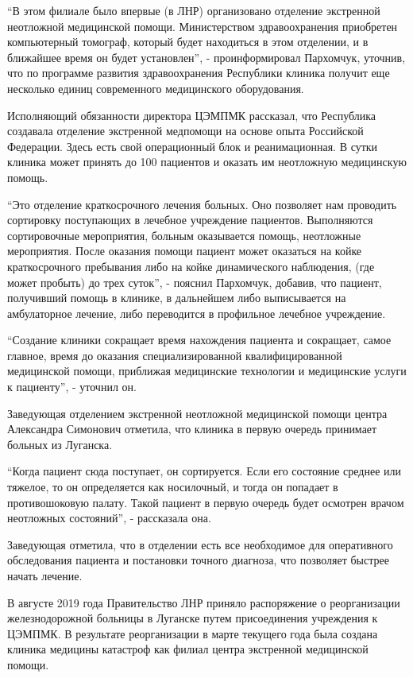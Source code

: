 \enquote{В этом филиале было впервые (в ЛНР) организовано отделение экстренной
неотложной медицинской помощи. Министерством здравоохранения приобретен
компьютерный томограф, который будет находиться в этом отделении, и в ближайшее
время он будет установлен}, - проинформировал Пархомчук, уточнив, что по
программе развития здравоохранения Республики клиника получит еще несколько
единиц современного медицинского оборудования.

Исполняющий обязанности директора ЦЭМПМК рассказал, что Республика создавала
отделение экстренной медпомощи на основе опыта Российской Федерации. Здесь есть
свой операционный блок и реанимационная. В сутки клиника может принять до 100
пациентов и оказать им неотложную медицинскую помощь.

\enquote{Это отделение краткосрочного лечения больных. Оно позволяет нам проводить
сортировку поступающих в лечебное учреждение пациентов. Выполняются
сортировочные мероприятия, больным оказывается помощь, неотложные мероприятия.
После оказания помощи пациент может оказаться на койке краткосрочного
пребывания либо на койке динамического наблюдения, (где может пробыть) до трех
суток}, - пояснил Пархомчук, добавив, что пациент, получивший помощь в клинике,
в дальнейшем либо выписывается на амбулаторное лечение, либо переводится в
профильное лечебное учреждение.

\enquote{Создание клиники сокращает время нахождения пациента и сокращает, самое
главное, время до оказания специализированной квалифицированной медицинской
помощи, приближая медицинские технологии и медицинские услуги к пациенту}, -
уточнил он.

Заведующая отделением экстренной неотложной медицинской помощи центра
Александра Симонович отметила, что клиника в первую очередь принимает больных
из Луганска.

\enquote{Когда пациент сюда поступает, он сортируется. Если его состояние среднее или
тяжелое, то он определяется как носилочный, и тогда он попадает в
противошоковую палату. Такой пациент в первую очередь будет осмотрен врачом
неотложных состояний}, - рассказала она.

Заведующая отметила, что в отделении есть все необходимое для оперативного
обследования пациента и постановки точного диагноза, что позволяет быстрее
начать лечение. 

В августе 2019 года Правительство ЛНР приняло распоряжение о реорганизации
железнодорожной больницы в Луганске путем присоединения учреждения к ЦЭМПМК. В
результате реорганизации в марте текущего года была создана клиника медицины
катастроф как филиал центра экстренной медицинской помощи.

